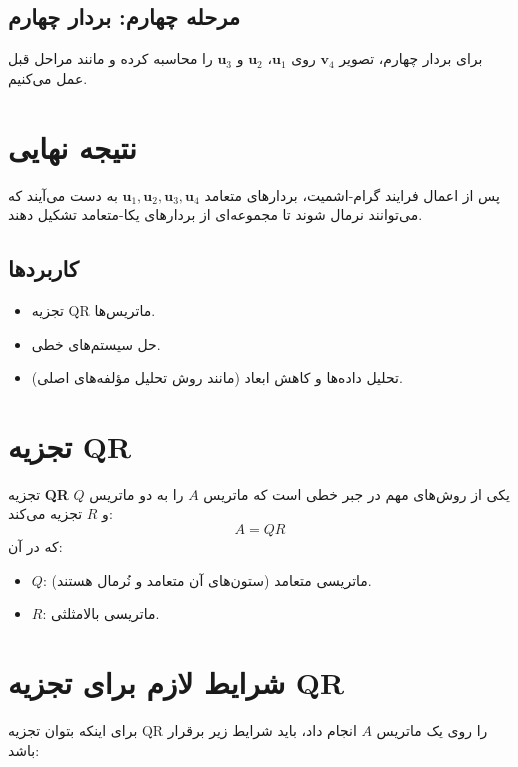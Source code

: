 \begin{example}
	
	\subsection*{مرحله چهارم: بردار چهارم}
	برای بردار چهارم، تصویر \( \mathbf{v}_4 \) روی \( \mathbf{u}_1 \)، \( \mathbf{u}_2 \) و \( \mathbf{u}_3 \) را محاسبه کرده و مانند مراحل قبل عمل می‌کنیم.
	
	\section*{نتیجه نهایی}
	پس از اعمال فرایند گرام-اشمیت، بردارهای متعامد \( \mathbf{u}_1, \mathbf{u}_2, \mathbf{u}_3, \mathbf{u}_4 \) به دست می‌آیند که می‌توانند نرمال شوند تا مجموعه‌ای از بردارهای یکا-متعامد تشکیل دهند.
	
\end{example}
\subsection{کاربردها}
\begin{itemize}
	\item تجزیه QR ماتریس‌ها.
	\item حل سیستم‌های خطی.
	\item تحلیل داده‌ها و کاهش ابعاد (مانند روش تحلیل مؤلفه‌های اصلی).
\end{itemize}

\section{تجزیه QR}
\begin{definition}
	
	
	تجزیه \textbf{QR} یکی از روش‌های مهم در جبر خطی است که ماتریس \( A \) را به دو ماتریس \( Q \) و \( R \) تجزیه می‌کند:
	\[
	A = QR
	\]
	که در آن:
	\begin{itemize}
		\item \( Q \): ماتریسی متعامد (ستون‌های آن متعامد و نُرمال هستند).
		\item \( R \): ماتریسی بالا‌مثلثی.
	\end{itemize}
\end{definition}
\section*{شرایط لازم برای تجزیه QR}

برای اینکه بتوان تجزیه QR را روی یک ماتریس \( A \) انجام داد، باید شرایط زیر برقرار باشد:

